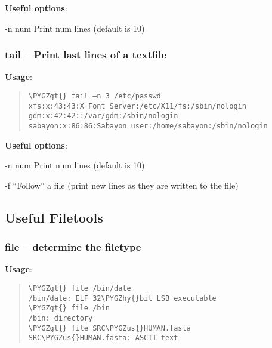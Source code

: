 \documentclass[a4paper,11pt,english]{sphinxmanual}
\def\PYGZus{\char`\_}
\def\PYGZgt{\char`\>}
\def\PYGZhy{\char`\-}
\begin{document}
\textbf{Useful options}:
\begin{optionlist}{3cm}
\item [-n num]  
Print num lines (default is 10)
\end{optionlist}


\subsubsection{tail – Print last lines of a textfile}
\label{introduction:tail-print-last-lines-of-a-textfile}
\textbf{Usage}:  
\begin{quote}

\begin{Verbatim}[frame=single, rulecolor=\color{lightgray}, fontfamily=courier, commandchars=\\\{\}]
\PYGZgt{} tail –n 3 /etc/passwd
xfs:x:43:43:X Font Server:/etc/X11/fs:/sbin/nologin
gdm:x:42:42::/var/gdm:/sbin/nologin
sabayon:x:86:86:Sabayon user:/home/sabayon:/sbin/nologin
\end{Verbatim}
\end{quote}

\textbf{Useful options}:
\begin{optionlist}{3cm}
\item [-n num]  
Print num lines (default is 10)
\item [-f]  
``Follow'' a file (print new lines as they are written to the file)
\end{optionlist}


\subsection{Useful Filetools}
\label{introduction:useful-filetools}

\subsubsection{file – determine the filetype}
\label{introduction:file-determine-the-filetype}
\textbf{Usage}:  
\begin{quote}

\begin{Verbatim}[frame=single, rulecolor=\color{lightgray}, fontfamily=courier, commandchars=\\\{\}]
\PYGZgt{} file /bin/date
/bin/date: ELF 32\PYGZhy{}bit LSB executable
\PYGZgt{} file /bin
/bin: directory
\PYGZgt{} file SRC\PYGZus{}HUMAN.fasta
SRC\PYGZus{}HUMAN.fasta: ASCII text
\end{Verbatim}
\end{quote}
\end{document}
